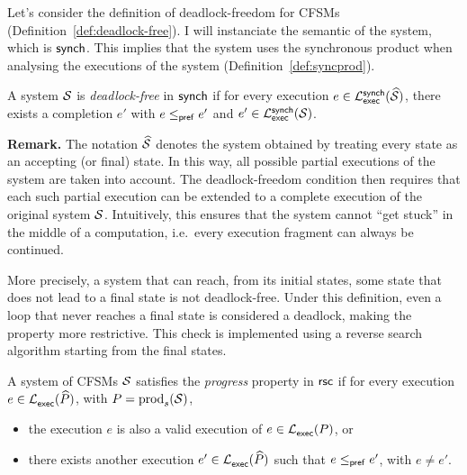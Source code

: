 Let's consider the definition of deadlock-freedom for CFSMs 
(Definition~\ref{def:deadlock-free}). I will instanciate the semantic of 
the system, which is $\mathsf{synch}$. This implies 
that the system uses the synchronous product when analysing the 
executions of the system (Definition~\ref{def:syncprod}).

\bigskip

\begin{definition}
A system $\mathcal{S}$ is \emph{deadlock-free} in $\mathsf{synch}$  
if for every execution 
$e \in \mathcal{L}_{\mathsf{exec}}^{\mathsf{synch}}(\widehat{\mathcal{S}})$,  
there exists a completion $e'$ with $e \mathrel{\leq_{\mathsf{pref}}} e'$ and  
$e' \in \mathcal{L}_{\mathsf{exec}}^{\mathsf{synch}}(\mathcal{S})$.  
\end{definition}

\textbf{Remark.} The notation $\widehat{\mathcal{S}}$ denotes the 
system obtained by treating every state as an accepting (or final) state. 
In this way, all possible partial executions of the system are taken 
into account. The deadlock-freedom condition then requires that each 
such partial execution can be extended to a complete execution of the 
original system $\mathcal{S}$. Intuitively, this ensures that the system 
cannot ``get stuck'' in the middle of a computation, i.e.\ every 
execution fragment can always be continued.  

More precisely, a system that can reach, from its initial states, some state
that does not lead to a final state is not deadlock-free. Under this definition,
even a loop that never reaches a final state is considered a deadlock,
making the property more restrictive. This check is implemented using a
reverse search algorithm starting from the final states.



\bigskip

\begin{definition}[Progress]\label{def:progress}
A system of CFSMs $\mathcal{S}$ satisfies the \emph{progress} property in $\mathsf{rsc}$
if for every execution $e \in \mathcal{L}_{\mathsf{exec}}^{}(\widehat{P})$, 
with $P = \mathrm{prod}_s(\mathcal{S})$,
\begin{itemize}
    \item the execution $e$ is also a valid execution of $e\in \mathcal{L}_{\mathsf{exec}}^{}(P)$, or
    \item there exists another execution $e'\in\mathcal{L}_{\mathsf{exec}}^{}(\widehat{P})$
          such that $e \mathrel{\leq_{\mathsf{pref}}} e'$, with $e \neq e'$.
\end{itemize}
\end{definition}

